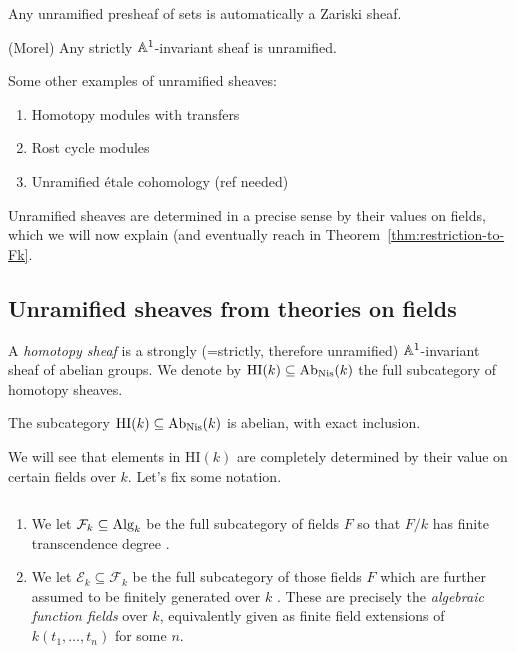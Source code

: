 \documentclass[11pt,openany]{book}
\providecommand{\HI}{\mathrm{HI}}
\begin{document}
\begin{example} Any unramified presheaf of sets is automatically a Zariski sheaf.
\end{example}

\begin{theorem} (Morel) Any strictly $\mathbb{A}^1$-invariant sheaf is unramified.
\end{theorem}

\begin{example} Some other examples of unramified sheaves:
\begin{enumerate}
    \item Homotopy modules with transfers
    \item Rost cycle modules
    \item Unramified \'etale cohomology (ref needed)
\end{enumerate}
\end{example}

Unramified sheaves are determined in a precise sense by their values on fields, which we will now explain (and eventually reach in Theorem~\ref{thm:restriction-to-Fk}.

\subsection{Unramified sheaves from theories on fields}



\begin{definition}
A \textit{homotopy sheaf} is a strongly (=strictly, therefore unramified) $\mathbb{A}^1$-invariant sheaf of abelian groups. We denote by $\HI(k) \subseteq \Ab_\Nis(k)$ the full subcategory of homotopy sheaves.
\end{definition}


\begin{theorem} \cite[6.24]{Morel}
The subcategory $\HI(k) \subseteq \Ab_\Nis(k)$ is abelian, with exact inclusion.
\end{theorem}

We will see that elements in $\HI(k)$ are completely determined by their value on certain fields over $k$. Let's fix some notation.


\begin{notation} $\ $
\begin{enumerate}
    \item We let $\mathcal{F}_k \subseteq \mathrm{Alg}_k$ be the full subcategory of fields $F$ so that $F/k$ has finite transcendence degree \cite[p.~vi]{Morel}.
    \item We let $\mathcal{E}_k \subseteq \mathcal{F}_k$ be the full subcategory of those fields $F$ which are further assumed to be finitely generated over $k$ \cite[p.~43]{Deglise-finite-corr}. These are precisely the \textit{algebraic function fields} over $k$, equivalently given as finite field extensions of $k(t_1, \ldots, t_n)$ for some $n$.
\end{enumerate}
\end{notation}
\end{document}
